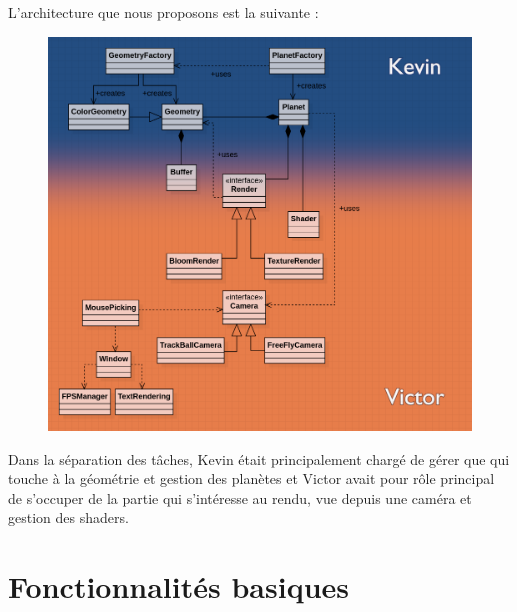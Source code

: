 \documentclass[11pt,a4paper]{article}
\begin{document}
L'architecture que nous proposons est la suivante :
\begin{figure}[h!]
\centering
\includegraphics[width=0.99\columnwidth]{Archi_gestion_de_projet.png}
\end{figure}

Dans la séparation des tâches, Kevin était principalement chargé de gérer que qui touche à la géométrie et gestion des planètes et Victor avait pour rôle principal de s'occuper de la partie qui s'intéresse au rendu, vue depuis une caméra et gestion des shaders.

\section{Fonctionnalités basiques}
\end{document}
